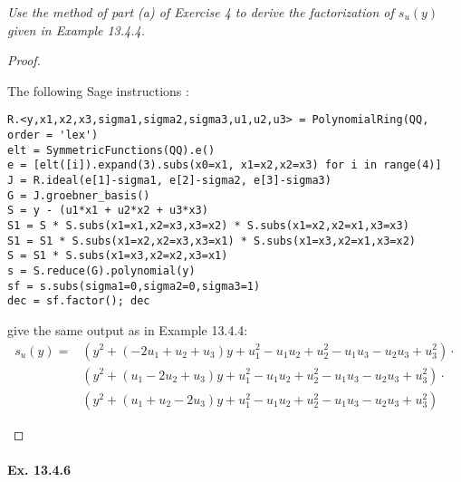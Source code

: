 \documentclass[11pt,a4paper]{article}
\newcommand{\be} {\begin{enumerate}}
\newcommand{\ee} {\end{enumerate}}
\begin{document}
{\it Use the method of part (a) of Exercise 4 to derive the factorization of $s_u(y)$ given in Example 13.4.4.
\begin{proof}
\be
The following Sage instructions :
\begin{verbatim}
R.<y,x1,x2,x3,sigma1,sigma2,sigma3,u1,u2,u3> = PolynomialRing(QQ, order = 'lex')
elt = SymmetricFunctions(QQ).e()
e = [elt([i]).expand(3).subs(x0=x1, x1=x2,x2=x3) for i in range(4)]
J = R.ideal(e[1]-sigma1, e[2]-sigma2, e[3]-sigma3)
G = J.groebner_basis()
S = y - (u1*x1 + u2*x2 + u3*x3)
S1 = S * S.subs(x1=x1,x2=x3,x3=x2) * S.subs(x1=x2,x2=x1,x3=x3)
S1 = S1 * S.subs(x1=x2,x2=x3,x3=x1) * S.subs(x1=x3,x2=x1,x3=x2)
S = S1 * S.subs(x1=x3,x2=x2,x3=x1)
s = S.reduce(G).polynomial(y)
sf = s.subs(sigma1=0,sigma2=0,sigma3=1)
dec = sf.factor(); dec 
\end{verbatim}
give the same output as in Example 13.4.4:
\begin{align*}
s_u(y)=&       	
(y^{2} + \left(-2 u_{1} + u_{2} + u_{3}\right) y + u_{1}^{2} -  u_{1}
u_{2} + u_{2}^{2} -  u_{1} u_{3} -  u_{2} u_{3} + u_{3}^{2}) \cdot\\
& 
(y^{2} + \left(u_{1} - 2 u_{2} + u_{3}\right) y + u_{1}^{2} -  u_{1}
u_{2} + u_{2}^{2} -  u_{1} u_{3} -  u_{2} u_{3} + u_{3}^{2}) \cdot\\
&
(y^{2} + \left(u_{1} + u_{2} - 2 u_{3}\right) y + u_{1}^{2} -  u_{1}
u_{2} + u_{2}^{2} -  u_{1} u_{3} -  u_{2} u_{3} + u_{3}^{2})
\end{align*}

\ee\end{proof}
}

\paragraph{Ex. 13.4.6}
\end{document}
